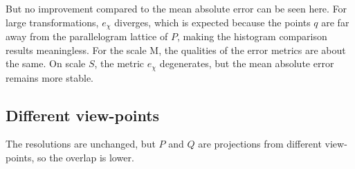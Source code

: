 {But no improvement compared to the mean absolute error can be seen here. For large transformations, $e_{\chi}$ diverges, which is expected because the points $q$ are far away from the parallelogram lattice of $P$, making the histogram comparison results meaningless. For the scale M, the qualities of the error metrics are about the same. On scale $S$, the metric $e_{\chi}$ degenerates, but the mean absolute error remains more stable.


\newpage

\subsection{Different view-points}
The resolutions are unchanged, but $P$ and $Q$ are projections from different view-points, so the overlap is lower.

}
